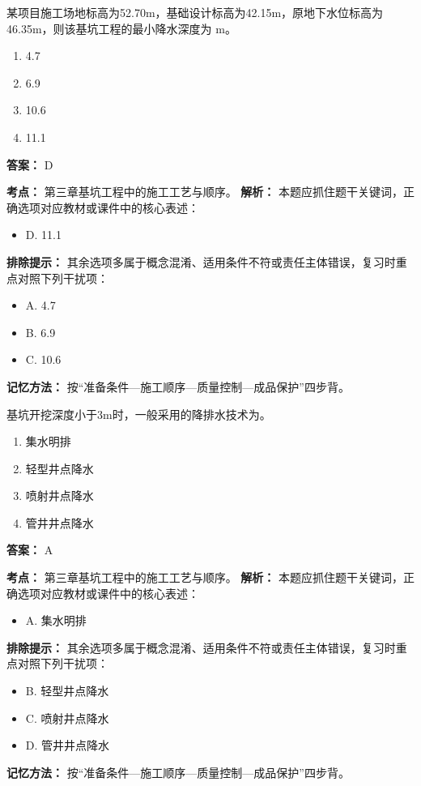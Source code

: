 \documentclass[UTF8,fontset=fandol,11pt]{ctexart}
\begin{document}
\begin{quizbox}[title={第 11 题}]
某项目施工场地标高为52.70m，基础设计标高为42.15m，原地下水位标高为46.35m，则该基坑工程的最小降水深度为 m。\\
\begin{enumerate}[label=\Alph*.]
\item 4.7
\item 6.9
\item 10.6
\item 11.1
\end{enumerate}
\textbf{答案：} D
\vspace{0.25em}
\begin{answerbox}[title={考点解析}]
\textbf{考点：} 第三章基坑工程中的施工工艺与顺序。
\textbf{解析：} 本题应抓住题干关键词，正确选项对应教材或课件中的核心表述：
\begin{itemize}
\item D. 11.1
\end{itemize}
\textbf{排除提示：} 其余选项多属于概念混淆、适用条件不符或责任主体错误，复习时重点对照下列干扰项：
\begin{itemize}
\item A. 4.7
\item B. 6.9
\item C. 10.6
\end{itemize}
\textbf{记忆方法：} 按“准备条件—施工顺序—质量控制—成品保护”四步背。
\end{answerbox}
\end{quizbox}

\begin{quizbox}[title={第 12 题}]
基坑开挖深度小于3m时，一般采用的降排水技术为。\\
\begin{enumerate}[label=\Alph*.]
\item 集水明排
\item 轻型井点降水
\item 喷射井点降水
\item 管井井点降水
\end{enumerate}
\textbf{答案：} A
\vspace{0.25em}
\begin{answerbox}[title={考点解析}]
\textbf{考点：} 第三章基坑工程中的施工工艺与顺序。
\textbf{解析：} 本题应抓住题干关键词，正确选项对应教材或课件中的核心表述：
\begin{itemize}
\item A. 集水明排
\end{itemize}
\textbf{排除提示：} 其余选项多属于概念混淆、适用条件不符或责任主体错误，复习时重点对照下列干扰项：
\begin{itemize}
\item B. 轻型井点降水
\item C. 喷射井点降水
\item D. 管井井点降水
\end{itemize}
\textbf{记忆方法：} 按“准备条件—施工顺序—质量控制—成品保护”四步背。
\end{answerbox}
\end{quizbox}
\end{document}
